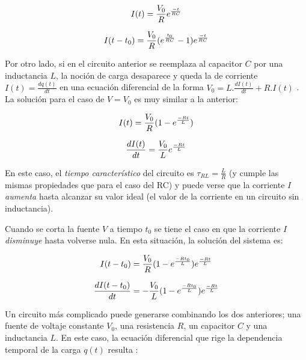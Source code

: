 \documentclass[11pt,a4paper]{article}
\begin{document}
\begin{equation}{\label{RC_carga_I}}
I(t)=\frac{V_{0}}{R}e^\frac{-t}{RC}
\end{equation}

\begin{equation}{\label{RC_descarga_I}}
I(t-t_{0}) = \frac{V_{0}}{R}(e^\frac{t_{0}}{RC}-1)e^\frac{-t}{RC}
\end{equation}

Por otro lado, si en el circuito anterior se reemplaza al capacitor $C$ por una inductancia $L$, la noción de carga desaparece y queda la de corriente $I(t) = \frac{dq(t)}{dt}$ en una ecuación diferencial de la forma $V_{0} = L.\frac{dI(t)}{dt}+R.I(t)$ \cite{Trelles}. La solución para el caso de $V= V_0$ es muy similar a la anterior:

\begin{equation}{\label{RL_carga_I}}
I(t)=\frac{V_0}{R}(1-e^\frac{-Rt}{L})
\end{equation}

\begin{equation}{\label{RL_carga}}
\dfrac{dI(t)}{dt}=\frac{V_{0}}{L}e^\frac{-Rt}{L}
\end{equation}

En este caso, el  \textit{tiempo característico} del circuito es $\tau_{RL}=\frac{L}{R}$ (y cumple las mismas propiedades que para el caso del RC) y puede verse que la corriente $I$ \textit{aumenta} hasta alcanzar su valor ideal (el valor de la corriente en un circuito sin inductancia).

Cuando se corta la fuente $V$ a tiempo $t_{0}$ se tiene el caso en que la corriente $I$ \textit{disminuye} hasta volverse nula. En esta situación, la solución del sistema es:

\begin{equation}{\label{RL_descarga_I}}
I(t-t_0)= \frac{V_{0}}{R}(1-e^\frac{-Rt_0}{L})e^\frac{-Rt}{L}
\end{equation}

\begin{equation}{\label{RL_descarga}}
\dfrac{dI(t-t_{0})}{dt}=-\frac{V_{0}}{L}(1-e^\frac{-Rt_{0}}{L})e^\frac{-Rt}{L}
\end{equation}


Un circuito más complicado puede generarse combinando los dos anteriores; una fuente de voltaje constante $V_0$, una resistencia $R$, un capacitor $C$ y una inductancia $L$. En este caso, la ecuación diferencial que rige la dependencia temporal de la carga $q(t)$ resulta \cite{Trelles}:
\end{document}
